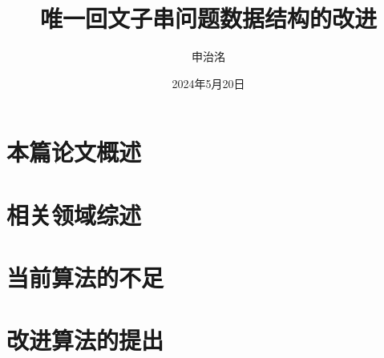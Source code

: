 \documentclass{ctexart}
\title{唯一回文子串问题数据结构的改进}
\author{申治洺}
\date{2024年5月20日}
\begin{document}
    \section{本篇论文概述}\label{sec:1}
    

    \section{相关领域综述}\label{sec:2}
    

    \section{当前算法的不足}\label{sec:3}
    

    \section{改进算法的提出}\label{sec:4}
    

    
    
\end{document}
